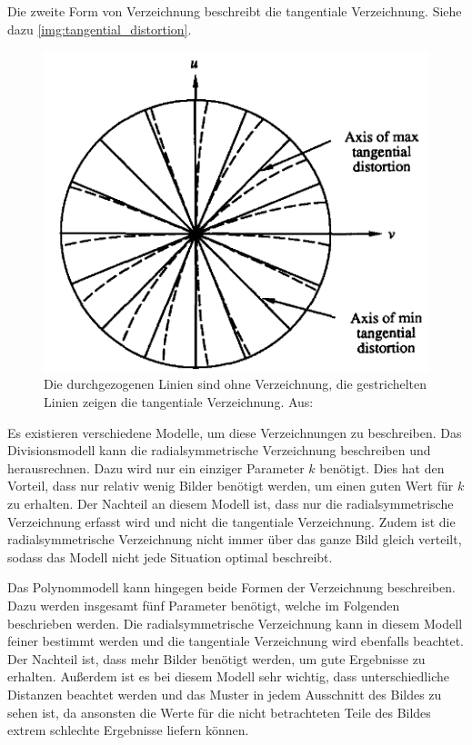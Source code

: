 Die zweite Form von Verzeichnung beschreibt die tangentiale Verzeichnung. Siehe dazu \autoref{img:tangential_distortion}.
\begin{figure}[!hbt]
	\centering
	\vspace{1ex}
	\includegraphics[scale=0.5]{../images/tangential_distortion}
	\caption[Die durchgezogenen Linien sind ohne Verzeichnung, die gestrichelten Linien zeigen die tangentiale Verzeichnung. Aus: \cite{tangential_distortion}]{\label{img:tangential_distortion}Die durchgezogenen Linien sind ohne Verzeichnung, die gestrichelten Linien zeigen die tangentiale Verzeichnung. Aus: \cite{tangential_distortion}}
	\vspace{1ex}
\end{figure}

Es existieren verschiedene Modelle, um diese Verzeichnungen zu beschreiben. Das Divisionsmodell kann die radialsymmetrische Verzeichnung beschreiben und herausrechnen. Dazu wird nur ein einziger Parameter $k$ benötigt. Dies hat den Vorteil, dass nur relativ wenig Bilder benötigt werden, um einen guten Wert für $k$ zu erhalten. Der Nachteil an diesem Modell ist, dass nur die radialsymmetrische Verzeichnung erfasst wird und nicht die tangentiale Verzeichnung. Zudem ist die radialsymmetrische Verzeichnung nicht immer über das ganze Bild gleich verteilt, sodass das Modell nicht jede Situation optimal beschreibt.

Das Polynommodell kann hingegen beide Formen der Verzeichnung beschreiben. Dazu werden insgesamt fünf Parameter benötigt, welche im Folgenden beschrieben werden. Die radialsymmetrische Verzeichnung kann in diesem Modell feiner bestimmt werden und die tangentiale Verzeichnung wird ebenfalls beachtet. Der Nachteil ist, dass mehr Bilder benötigt werden, um gute Ergebnisse zu erhalten. Außerdem ist es bei diesem Modell sehr wichtig, dass unterschiedliche Distanzen beachtet werden und das Muster in jedem Ausschnitt des Bildes zu sehen ist, da ansonsten die Werte für die nicht betrachteten Teile des Bildes extrem schlechte Ergebnisse liefern können.

